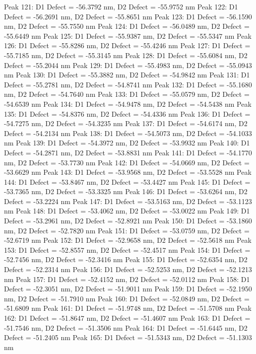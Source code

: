 \documentclass{article}
\begin{document}
Peak 121: D1 Defect = -56.3792 nm, D2 Defect = -55.9752 nm
Peak 122: D1 Defect = -56.2691 nm, D2 Defect = -55.8651 nm
Peak 123: D1 Defect = -56.1590 nm, D2 Defect = -55.7550 nm
Peak 124: D1 Defect = -56.0489 nm, D2 Defect = -55.6449 nm
Peak 125: D1 Defect = -55.9387 nm, D2 Defect = -55.5347 nm
Peak 126: D1 Defect = -55.8286 nm, D2 Defect = -55.4246 nm
Peak 127: D1 Defect = -55.7185 nm, D2 Defect = -55.3145 nm
Peak 128: D1 Defect = -55.6084 nm, D2 Defect = -55.2044 nm
Peak 129: D1 Defect = -55.4983 nm, D2 Defect = -55.0943 nm
Peak 130: D1 Defect = -55.3882 nm, D2 Defect = -54.9842 nm
Peak 131: D1 Defect = -55.2781 nm, D2 Defect = -54.8741 nm
Peak 132: D1 Defect = -55.1680 nm, D2 Defect = -54.7640 nm
Peak 133: D1 Defect = -55.0579 nm, D2 Defect = -54.6539 nm
Peak 134: D1 Defect = -54.9478 nm, D2 Defect = -54.5438 nm
Peak 135: D1 Defect = -54.8376 nm, D2 Defect = -54.4336 nm
Peak 136: D1 Defect = -54.7275 nm, D2 Defect = -54.3235 nm
Peak 137: D1 Defect = -54.6174 nm, D2 Defect = -54.2134 nm
Peak 138: D1 Defect = -54.5073 nm, D2 Defect = -54.1033 nm
Peak 139: D1 Defect = -54.3972 nm, D2 Defect = -53.9932 nm
Peak 140: D1 Defect = -54.2871 nm, D2 Defect = -53.8831 nm
Peak 141: D1 Defect = -54.1770 nm, D2 Defect = -53.7730 nm
Peak 142: D1 Defect = -54.0669 nm, D2 Defect = -53.6629 nm
Peak 143: D1 Defect = -53.9568 nm, D2 Defect = -53.5528 nm
Peak 144: D1 Defect = -53.8467 nm, D2 Defect = -53.4427 nm
Peak 145: D1 Defect = -53.7365 nm, D2 Defect = -53.3325 nm
Peak 146: D1 Defect = -53.6264 nm, D2 Defect = -53.2224 nm
Peak 147: D1 Defect = -53.5163 nm, D2 Defect = -53.1123 nm
Peak 148: D1 Defect = -53.4062 nm, D2 Defect = -53.0022 nm
Peak 149: D1 Defect = -53.2961 nm, D2 Defect = -52.8921 nm
Peak 150: D1 Defect = -53.1860 nm, D2 Defect = -52.7820 nm
Peak 151: D1 Defect = -53.0759 nm, D2 Defect = -52.6719 nm
Peak 152: D1 Defect = -52.9658 nm, D2 Defect = -52.5618 nm
Peak 153: D1 Defect = -52.8557 nm, D2 Defect = -52.4517 nm
Peak 154: D1 Defect = -52.7456 nm, D2 Defect = -52.3416 nm
Peak 155: D1 Defect = -52.6354 nm, D2 Defect = -52.2314 nm
Peak 156: D1 Defect = -52.5253 nm, D2 Defect = -52.1213 nm
Peak 157: D1 Defect = -52.4152 nm, D2 Defect = -52.0112 nm
Peak 158: D1 Defect = -52.3051 nm, D2 Defect = -51.9011 nm
Peak 159: D1 Defect = -52.1950 nm, D2 Defect = -51.7910 nm
Peak 160: D1 Defect = -52.0849 nm, D2 Defect = -51.6809 nm
Peak 161: D1 Defect = -51.9748 nm, D2 Defect = -51.5708 nm
Peak 162: D1 Defect = -51.8647 nm, D2 Defect = -51.4607 nm
Peak 163: D1 Defect = -51.7546 nm, D2 Defect = -51.3506 nm
Peak 164: D1 Defect = -51.6445 nm, D2 Defect = -51.2405 nm
Peak 165: D1 Defect = -51.5343 nm, D2 Defect = -51.1303 nm
\end{document}
